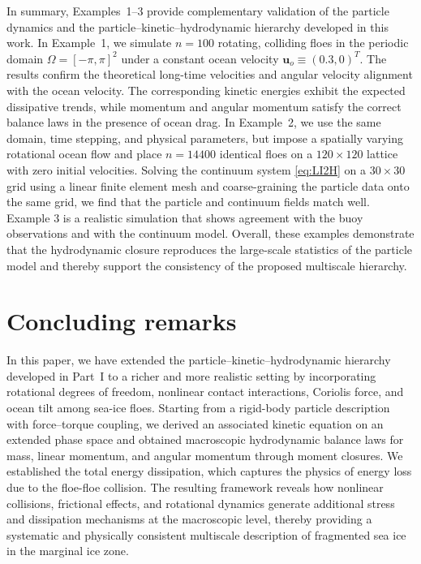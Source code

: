 \documentclass[a4paper,11pt]{article}
\numberwithin{equation}{section}
\theoremstyle{definition}
\newcommand{\bfu}{\boldsymbol{u}_o}
\begin{document}
In summary,
Examples~1--3 provide complementary validation of the particle dynamics and the particle--kinetic--hydrodynamic hierarchy developed in this work. In Example~1, we simulate $n=100$ rotating, colliding floes in the periodic domain $\Omega=[-\pi,\pi]^2$ under a constant ocean velocity $\bfu\equiv(0.3,0)^{T}$. The results confirm the theoretical long-time velocities and angular velocity alignment with the ocean velocity. The corresponding kinetic energies exhibit the expected dissipative trends, while momentum and angular momentum satisfy the correct balance laws in the presence of ocean drag. 
%
In Example~2, we use the same domain, time stepping, and physical parameters, but impose a spatially varying rotational ocean flow and place $n=14400$ identical floes on a $120\times 120$ lattice with zero initial velocities. Solving the continuum system \eqref{eq:LI2H} on a $30\times 30$ grid using a linear finite element mesh and coarse-graining the particle data onto the same grid, we find that the particle and continuum fields match well.
Example 3 is a realistic simulation that shows agreement with the buoy observations and with the continuum model.
Overall, these examples demonstrate that the hydrodynamic closure reproduces the large-scale statistics of the particle model and thereby support the consistency of the proposed multiscale hierarchy.




\section{Concluding remarks} \label{sec:conclusion}
In this paper, we have extended the particle–kinetic–hydrodynamic hierarchy developed in Part~I to a richer and more realistic setting by incorporating rotational degrees of freedom, nonlinear contact interactions, Coriolis force, and ocean tilt among sea-ice floes. 
Starting from a rigid-body particle description with force–torque coupling, we derived an associated kinetic equation on an extended phase space and obtained macroscopic hydrodynamic balance laws for mass, linear momentum, and angular momentum through moment closures. 
We established the total energy dissipation, which captures the physics of energy loss due to the floe-floe collision.
The resulting framework reveals how nonlinear collisions, frictional effects, and rotational dynamics generate additional stress and dissipation mechanisms at the macroscopic level, thereby providing a systematic and physically consistent multiscale description of fragmented sea ice in the marginal ice zone.
\end{document}
